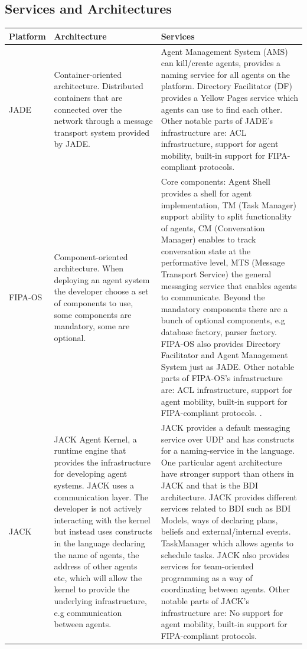 \documentclass[paper=letter, fontsize=12pt]{article}
\begin{document}
\subsection{Services and Architectures}
\begin{tabular}{|p{2cm} p{6cm} p{6cm}|}
\hline
\textbf{Platform}  & \textbf{Architecture} & \textbf{Services} \\
\hline
JADE & Container-oriented architecture. Distributed containers that are connected over the network through a message transport system provided by JADE. \citep{jade-2}& Agent Management System (AMS) can kill/create agents, provides a naming service for all agents on the platform. Directory Facilitator (DF) provides a Yellow Pages service which agents can use to find each other. Other notable parts of JADE's infrastructure are: ACL infrastructure, support for agent mobility, built-in support for FIPA-compliant protocols. \citep{jade-2}\\
\hline
FIPA-OS & Component-oriented architecture. When deploying an agent system the developer choose a set of components to use, some components are mandatory, some are optional. \citep{fipa-os-2}& Core components: Agent Shell provides a shell for agent implementation, TM (Task Manager) support ability to split functionality of agents, CM (Conversation Manager) enables to track conversation state at the performative level, MTS (Message Transport Service) the general messaging service that enables agents to communicate. Beyond the mandatory components there are a bunch of optional components, e.g database factory, parser factory. FIPA-OS also provides Directory Facilitator and Agent Management System just as JADE. Other notable parts of FIPA-OS's infrastructure are: ACL infrastructure, support for agent mobility, built-in support for FIPA-compliant protocols. \citep{fipa-os-2}.\\
\hline
JACK  & JACK Agent Kernel, a runtime engine that provides the infrastructure for developing agent systems. JACK uses a communication layer. The developer is not actively interacting with the kernel but instead uses constructs in the language declaring the name of agents, the address of other agents etc, which will allow the kernel to provide the underlying infrastructure, e.g communication between agents. \citep{jack-2} & JACK provides a default messaging service over UDP and has constructs for a naming-service in the language. One particular agent architecture have stronger support than others in JACK and that is the BDI architecture. JACK provides different services related to BDI such as BDI Models, ways of declaring plans, beliefs and external/internal events. TaskManager which allows agents to schedule tasks. JACK also provides services for team-oriented programming as a way of coordinating between agents. Other notable parts of JACK's infrastructure are: No support for agent mobility, built-in support for FIPA-compliant protocols. \citep{luck_book}\\
\hline
\end{tabular}
\end{document}

